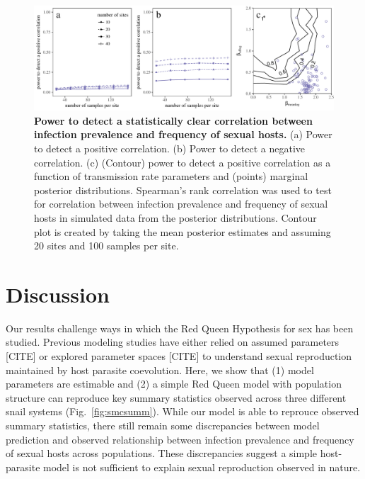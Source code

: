 \documentclass{article}\usepackage[]{graphicx}\usepackage[]{color}
\newcommand{\fref}[1]{Fig.~\ref{fig:#1}}
\begin{document}
\begin{figure}[!ht]
\includegraphics[width=\textwidth]{../fig/power.pdf}
\caption{{\bf Power to detect a statistically clear correlation between infection prevalence and frequency of sexual hosts.}
(a) Power to detect a positive correlation. 
(b) Power to detect a negative correlation. 
(c) (Contour) power to detect a positive correlation as a function of transmission rate parameters and (points) marginal posterior distributions.
Spearman's rank correlation was used to test for correlation between infection prevalence and frequency of sexual hosts in simulated data from the posterior distributions.
Contour plot is created by taking the mean posterior estimates and assuming 20 sites and 100 samples per site.
}
\label{fig:power}
\end{figure}

\section{Discussion}

Our results challenge ways in which the Red Queen Hypothesis for sex has been studied.
Previous modeling studies have either relied on assumed parameters [CITE] or explored parameter spaces [CITE]
to understand sexual reproduction maintained by host parasite coevolution.
Here, we show that (1) model parameters are estimable and (2) a simple Red Queen model with population structure can reproduce key summary statistics observed across three different snail systems (\fref{smcsumm}).
While our model is able to reprouce observed summary statistics, there still remain some discrepancies between model prediction and observed relationship between infection prevalence and frequency of sexual hosts across populations.
These discrepancies suggest a simple host-parasite model is not sufficient to explain sexual reproduction observed in nature.
\end{document}
